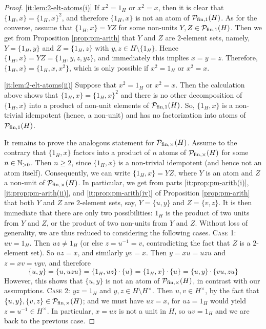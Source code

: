 \begin{proof}
\ref{it:lem:2-elt-atoms(i)} If $x^2 = 1_H$ or $x^2 = x$, then it is clear that $\{1_H,x\} = \{1_H,x\}^2$, and therefore $\{1_H,x\}$ is not an atom of $\mathcal P_{\textrm{fin}, 1}(H)$. As for the converse, assume that $\{1_H,x\} = YZ$ for some non-units $Y,Z \in \mathcal P_{\textrm{fin}, 1}(H)$. Then we get from Proposition \ref{prop:pm-arith} that $Y$ and $Z$ are $2$-element sets, namely, $Y = \{1_H, y\}$ and $Z = \{1_H, z\}$ with $y,z \in H \setminus \{1_H\}$. Hence $\{1_H,x\} = YZ = \{1_H,y,z,yz\}$, and immediately this implies $x=y=z$. Therefore, $\{1_H,x\} = \{1_H,x,x^2\}$, which is only possible if $x^2 = 1_H$ or $x^2 = x$.

\ref{it:lem:2-elt-atoms(ii)} Suppose that $x^2 = 1_H$ or $x^2 = x$. Then the calculation above shows that $\{1_H,x\} = \{1_H,x\}^2$ and there is no other decomposition of $\{1_H,x\}$ into a product of non-unit elements of $\mathcal P_{\textrm{fin},1}(H)$. So, $\{1_H,x\}$ is a non-trivial idempotent (hence, a non-unit) and has no factorization into atoms of $\mathcal P_{\textrm{fin},1}(H)$.

It remains to prove the analogous statement for $\mathcal P_{\textrm{fin},\times}(H)$.
{Assume to the} contrary that $\{1_H,x\}$ factors into a product of $n$ atoms of $\mathcal P_{\textrm{fin},\times}(H)$ for some $n \in \mathbb{N}_{>0}$. Then $n \ge 2$, since $\{1_H, x\}$ is a non-trivial idempotent (and hence not an atom itself). Consequently, we can write $\{1_H,x\} = YZ$, where $Y$ is an atom and $Z$ a non-unit of $\mathcal P_{\textrm{fin},\times}(H)$. In particular, we get from parts \ref{it:prop:pm-arith(i)}, \ref{it:prop:pm-arith(ii)}, and \ref{it:prop:pm-arith(iv)} of Proposition \ref{prop:pm-arith} that both $Y$ and $Z$ are $2$-element sets, say, $Y = \{u, y\}$ and $Z = \{v, z\}$. It is then immediate that there are only two possibilities: $1_H$ is the product of two units from $Y$ and $Z$, or the product of two non-units from $Y$ and $Z$.
Without loss of generality, we are thus reduced to considering the following cases.
\vskip 0.1cm
\textsc{Case 1:} $uv=1_H$. Then $uz \ne 1_H$ (or else $z = u^{-1} = v$, contradicting the fact that $Z$ is a $2$-element set). So $uz=x$, and similarly $yv=x$. Then $y = xu = uzu$ and $z = xv = vyv$, and therefore
\[
\{u,y\} = \{u,uzu\} = \{1_H,uz\}\cdot \{u\} = \{1_H,x\}\cdot\{u\} = \{u,y\}\cdot \{vu,zu\}
\]
However, this shows that $\{u,y\}$ is not an atom of $\mathcal{P}_{\textrm{fin}, \times}(H)$, in contrast with our assumptions.
\vskip 0.1cm
\textsc{Case 2:}
$yz = 1_H$ and $y,z\in H\setminus H^\times$. Then $u,v\in H^\times$, by the fact that $\{u, y\}, \{v, z\} \in \mathcal P_{\textrm{fin},\times}(H)$; and we must have $uz=x$, for $uz=1_H$ would yield $z = u^{-1}\in H^\times$.
In particular, $x = uz$ is not a unit in $H$, so $uv=1_H$ and we are back to the previous case.
\end{proof}
